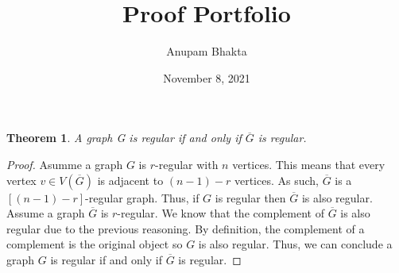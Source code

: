 \documentclass[11pt]{article}
\date{November 8, 2021}
\title{Proof Portfolio}
\author{Anupam Bhakta}
\newtheorem{theorem}{Theorem}
\begin{document}
	
\maketitle

\begin{theorem}
A graph G is regular if and only if $\overline{G}$ is regular.
\end{theorem}

\begin{proof}
Asumme a graph $G$ is $r$-regular with $n$ vertices. This means that every vertex $v\in V(\overline{G})$ is adjacent to $(n-1)-r$ vertices. As such, $\overline{G}$ is a $[(n-1)-r]$-regular graph. Thus, if $G$ is regular then $\overline{G}$ is also regular. \\

Assume a graph $\overline{G}$ is $r$-regular. We know that the complement of $\overline{G}$ is also regular due to the previous reasoning. By definition, the complement of a complement is the original object so $G$ is also regular. Thus, we can conclude a graph $G$ is regular if and only if $\overline{G}$ is regular.
\end{proof}
\end{document}
